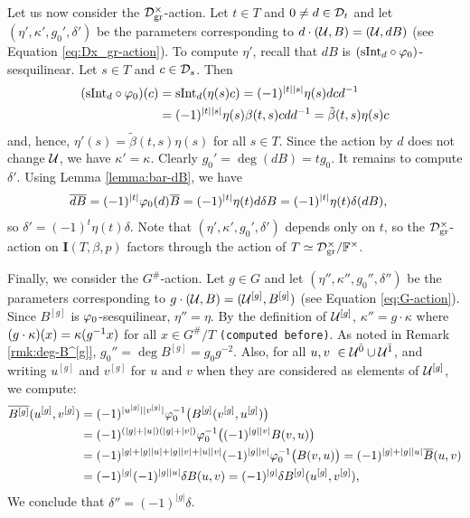 Let us now consider the $\mathcal{D}^\times_{\mathrm{gr}}$-action.
Let $t\in T$ and $0\neq d \in \mathcal{D}_t$ and let $(\eta', \kappa', g_0', \delta')$ be the parameters corresponding to $d \cdot (\mathcal U, B) = (\mathcal U, d B)$ (see Equation \eqref{eq:Dx_gr-action}).
To compute $\eta'$, recall that $dB$ is $(\mathrm{sInt}_d \circ \varphi_0)$-sesquilinear.
Let $s\in T$ and $c \in \mathcal{D}_s$.
Then
\begin{align*}
	(\mathrm{sInt}_{d} \circ \varphi_0) (c) & = \mathrm{sInt}_{d} ( \eta(s) c ) = (-1)^{|t||s|} \eta(s) d c d^{-1}          \\
	                                      & = (-1)^{|t||s|} \eta(s) \beta(t,s) c d d^{-1} = \tilde{\beta} (t,s) \eta(s) c
\end{align*}
and, hence, $\eta' (s) = \tilde{\beta} (t,s) \eta(s)$ for all $s\in T$.
Since the action by $d$ does not change $\mathcal U$, we have $\kappa' = \kappa$.
Clearly $g_0' = \deg (dB) = t g_0$.
It remains to compute $\delta'$.
Using Lemma \ref{lemma:bar-dB}, we have
\begin{align*}
	\overline{d B} & = (-1)^{|t|} \varphi_0(d) \overline{B} = (-1)^{|t|} \eta(t) d \delta B = (-1)^{|t|} \eta(t) \delta (d B),
\end{align*}
so $\delta' = (-1)^{t} \eta(t) \delta$.
Note that $(\eta', \kappa', g_0', \delta')$ depends only on $t$, so the $\mathcal{D}^\times_\mathrm{gr}$-action on $\mathbf{I}(T, \beta, p)$ factors through the action of $T \simeq \mathcal{D}^\times_\mathrm{gr}/\mathbb{F}^\times$.

Finally, we consider the $G^\#$-action.
Let $g\in G$ and let $(\eta'', \kappa'', g_0'', \delta'')$ be the parameters corresponding to $g \cdot (\mathcal U, B) = (\mathcal U^{[g]}, B^{[g]})$ (see Equation \eqref{eq:G-action}).
Since $B^{[g]}$ is $\varphi_0$-sesquilinear, $\eta'' = \eta$. By the definition of $\mathcal U^{[g]}$, $\kappa'' = g\cdot \kappa$ where $(g\cdot \kappa) (x) = \kappa(g^{-1} x)$ for all $x\in G^\#/T$ {\tt (computed before)}.
As noted in Remark \ref{rmk:deg-B^[g]}, $g_0'' = \deg B^{[g]} = g_0 g^{-2}$.
Also, for all $u, v\ \in \mathcal U^{\bar0} \cup \mathcal U^{\bar1}$, and writing $u^{[g]}$ and $v^{[g]}$ for $u$ and $v$ when they are considered as elements of $\mathcal U^{[g]}$, we compute:
\begin{align*}
	\overline{B^{[g]}}(u^{[g]},v^{[g]}) & = (-1)^{|u^{[g]}||v^{[g]}|} \varphi_0^{-1} \big( B^{[g]} (v^{[g]}, u^{[g]}) \big)                                              \\
	                                    & = (-1)^{(|g| + |u|) (|g| + |v|)} \varphi_0^{-1} \big( (-1)^{|g||v|} B(v, u) \big)                                              \\
	                                    & = (-1)^{|g| + |g||u| + |g||v| + |u||v|} (-1)^{|g||v|} \varphi_0^{-1} \big(B(v, u) \big) = (-1)^{|g| + |g||u|} \overline B(u,v) \\
	                                    & = (-1)^{|g|} (-1)^{|g||u|} \delta B(u,v) = (-1)^{|g|} \delta B^{[g]}(u^{[g]},v^{[g]}),
\end{align*}
We conclude that $\delta'' = (-1)^{|g|} \delta$.

